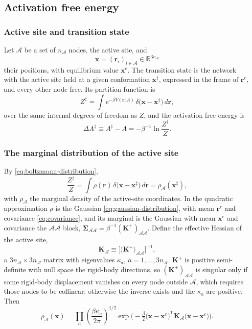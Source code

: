 \documentclass[11pt]{article}
\newcommand{\rr}{\mathbf{r}}
\newcommand{\KK}{\mathbf{K}}
\newcommand{\LL}{\Lambda}
\newcommand{\re}{\rr^{e}}
\newcommand{\xx}{\mathbf{x}}
\newcommand{\cA}{\mathcal{A}}
\newcommand{\nA}{n_{\cA}}
\newcommand{\KA}{\KK_{\cA}}
\newcommand{\xts}{\xx^{\ddagger}}
\begin{document}
\subsection{Activation free energy}
\label{sec:activation}

\subsubsection{Active site and transition state}

Let $\cA$ be a set of $\nA$ nodes, the active site, and
\begin{equation}
\xx = (\rr_i)_{i \in \cA} \in \mathbb{R}^{3\nA}
\end{equation}
their positions, with equilibrium value $\xx^{e}$.
The transition state is the network with the active site held at a given conformation $\xts$, expressed in the frame of $\re$, and every other node free.
Its partition function is
\begin{equation}
Z^{\ddagger} = \int e^{-\beta V(\rr;\LL)}\, \delta\big(\xx - \xts\big)\, d\rr ,
\label{eq:ts-partition-function}
\end{equation}
over the same internal degrees of freedom as $Z$, and the activation free energy is
\begin{equation}
\Delta A^{\ddagger} \equiv A^{\ddagger} - A = -\beta^{-1} \ln \frac{Z^{\ddagger}}{Z} .
\label{eq:activation-definition}
\end{equation}

\subsubsection{The marginal distribution of the active site}

By \eqref{eq:boltzmann-distribution},
\begin{equation}
\frac{Z^{\ddagger}}{Z} = \int \rho(\rr)\, \delta\big(\xx - \xts\big)\, d\rr = \rho_{\cA}(\xts),
\end{equation}
with $\rho_{\cA}$ the marginal density of the active-site coordinates.
In the quadratic approximation $\rho$ is the Gaussian \eqref{eq:gaussian-distribution}, with mean $\re$ and covariance \eqref{eq:covariance}, and its marginal is the Gaussian with mean $\xx^{e}$ and covariance the $\cA\cA$ block, $\bm{\Sigma}_{\cA\cA} = \beta^{-1}(\KK^{+})_{\cA\cA}$.
Define the effective Hessian of the active site,
\begin{equation}
\boxed{
\KA \equiv \Big[\big(\KK^{+}\big)_{\cA\cA}\Big]^{-1} ,
}
\label{eq:active-site-hessian}
\end{equation}
a $3\nA \times 3\nA$ matrix with eigenvalues $\kappa_a$, $a = 1, \ldots, 3\nA$.
$\KK^{+}$ is positive semi-definite with null space the rigid-body directions, so $(\KK^{+})_{\cA\cA}$ is singular only if some rigid-body displacement vanishes on every node outside $\cA$, which requires those nodes to be collinear; otherwise the inverse exists and the $\kappa_a$ are positive.
Then
\begin{equation}
\rho_{\cA}(\xx) = \prod_{a} \left(\frac{\beta\kappa_a}{2\pi}\right)^{1/2}
\exp\Big(-\tfrac{\beta}{2}\big(\xx - \xx^{e}\big)^{\mathsf T}\KA\big(\xx - \xx^{e}\big)\Big).
\label{eq:active-site-marginal}
\end{equation}
\end{document}
